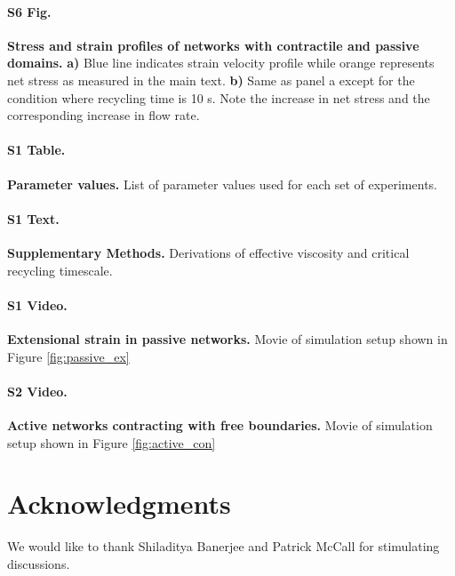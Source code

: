 \documentclass[10pt,letterpaper]{article}
\begin{document}
\paragraph*{S6 Fig.}
\label{fig:combo_prof}
{\bf Stress and strain profiles of networks with contractile and passive domains.}    \textbf{a)} Blue line indicates strain velocity profile while orange represents net stress as measured in the main text. \textbf{b)} Same as panel a except for the condition where recycling time is 10 s.  Note the increase in net stress and the corresponding increase in flow rate. 

\paragraph*{S1 Table.}
\label{S1_Table}
{\bf Parameter values.}  List of parameter values used for each set of experiments.

\paragraph*{S1 Text.}
\label{S1_Text}
{\bf Supplementary Methods.} Derivations of effective viscosity and critical recycling timescale.

\paragraph*{S1 Video.}
\label{passive_ex_video}
{\bf Extensional strain in passive networks.}  Movie of simulation setup shown in Figure \ref{fig:passive_ex}

\paragraph*{S2 Video.}
\label{active_con_video}
{\bf Active networks contracting with free boundaries.}  Movie of simulation setup shown in Figure \ref{fig:active_con}

\section*{Acknowledgments}
We would like to thank Shiladitya Banerjee and Patrick McCall for stimulating discussions.

\nolinenumbers

% 


\end{document}
